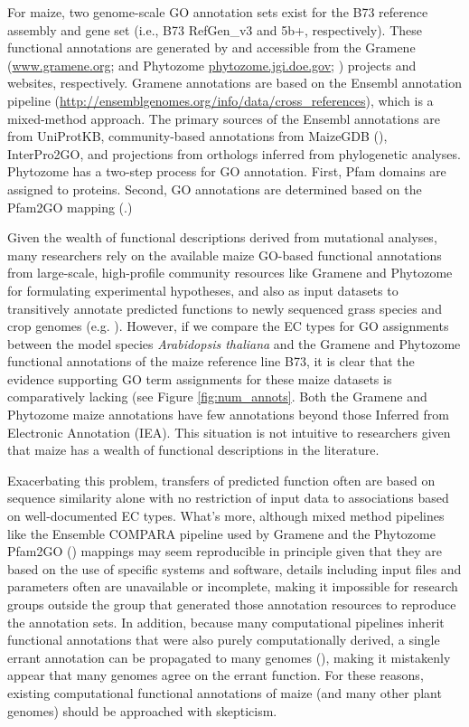 For maize, two genome-scale GO annotation sets exist for the B73 reference assembly and gene set (i.e., B73 RefGen\_v3 and 5b+, respectively). These functional annotations are generated by and accessible from the Gramene \sloppy (\href{www.gramene.org}{www.gramene.org}; \cite{telloruiz_2016-qu} and Phytozome \href{phytozome.jgi.doe.gov}{phytozome.jgi.doe.gov}; \cite{goodstein_2012-AM}) projects and websites, respectively. Gramene annotations are based on the Ensembl annotation pipeline
(\href{http://ensemblgenomes.org/info/data/cross\_references}{http://ensemblgenomes.org/info/data/cross\_references}), which is a mixed-method approach. The primary sources of the Ensembl annotations are from UniProtKB, community-based annotations from MaizeGDB (\cite{andorf_2016-wk}), InterPro2GO, and projections from orthologs inferred from phylogenetic analyses. Phytozome has a two-step process for GO annotation.  First, Pfam domains are assigned to proteins. Second, GO annotations are determined based on the Pfam2GO mapping (\cite{hunter_2009-6D}.)

Given the wealth of functional descriptions derived from mutational analyses, many researchers rely on the available maize GO-based functional annotations from large-scale, high-profile community resources like Gramene and Phytozome for formulating experimental hypotheses, and also as input datasets to transitively annotate predicted functions to newly sequenced grass species and crop genomes (e.g. \cite{hirsch_2016-Gs}). However, if we compare the EC types for GO assignments between the model species \emph{Arabidopsis thaliana} and the Gramene and Phytozome functional annotations of the maize reference line B73, it is clear that the evidence supporting GO term assignments for these maize datasets is comparatively lacking (see Figure \ref{fig:num_annots}. Both the Gramene and Phytozome maize annotations have few annotations beyond those Inferred from Electronic Annotation (IEA). This situation is not intuitive to researchers given that maize has a wealth of functional descriptions in the literature.

Exacerbating this problem, transfers of predicted function often are based on sequence similarity alone with no restriction of input data to associations based on well-documented EC types. What's more, although mixed method pipelines like the Ensemble COMPARA pipeline used by Gramene and the Phytozome Pfam2GO (\cite{herrero_2016-k1,goodstein_2012-AM}) mappings may seem reproducible in principle given that they are based on the use of specific systems and software, details including input files and parameters often are unavailable or incomplete, making it impossible for research groups outside the group that generated those annotation resources to reproduce the annotation sets. In addition, because many computational pipelines inherit functional annotations that were also purely computationally derived, a single errant annotation can be propagated to many genomes (\cite{andorf_2007-5F}), making it mistakenly appear that many genomes agree on the errant function.  For these reasons, existing computational functional annotations of maize (and many other plant genomes) should be approached with skepticism.

